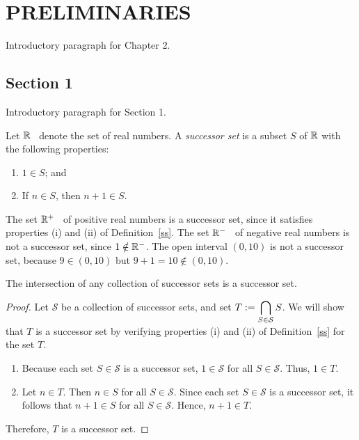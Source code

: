 \chapter{PRELIMINARIES}

Introductory paragraph for Chapter 2.

\section{Section 1}

Introductory paragraph for Section 1. 

\begin{defn}\label{ss}
	\cite{BkEx} Let $\mathbb{R}$~\label{real} denote the set of real numbers. A \textit{successor set} is a subset $S$ of $\mathbb{R}$ with the following properties:
	\begin{enumerate}
		\item[(i)] $1\in S$; and
		\item[(ii)] If $n\in S$, then $n+1\in S$.
	\end{enumerate}
\end{defn}

\begin{ex}
	The set $\mathbb{R}^+$~\label{preal} of positive real numbers is a successor set, since it satisfies properties (i) and (ii) of Definition~\ref{ss}. The set $\mathbb{R}^-$~\label{nreal} of negative real numbers is not a successor set, since $1\notin\mathbb{R}^-$. The open interval $(0,10)$ is not a successor set, because $9\in(0,10)$ but $9+1=10\notin(0,10)$.
\end{ex}

\begin{prop}\label{ints}
	The intersection of any collection of successor sets is a successor set.
\end{prop}

\begin{proof}
	Let $\mathcal{S}$ be a collection of successor sets, and set $T:=\displaystyle\bigcap_{S\in\mathcal{S}} S$. We will show that $T$ is a successor set by verifying properties (i) and (ii) of Definition~\ref{ss} for the set $T$.
	\begin{enumerate}
		\item[(i)] Because each set $S\in\mathcal{S}$ is a successor set, $1\in\mathcal{S}$ for all $S\in\mathcal{S}$. Thus, $1\in T$.
		\item[(ii)] Let $n\in T$. Then $n\in S$ for all $S\in\mathcal{S}$. Since each set $S\in\mathcal{S}$ is a successor set, it follows that $n+1\in S$ for all $S\in\mathcal{S}$. Hence, $n+1\in T$.
	\end{enumerate}
	Therefore, $T$ is a successor set.
\end{proof}

